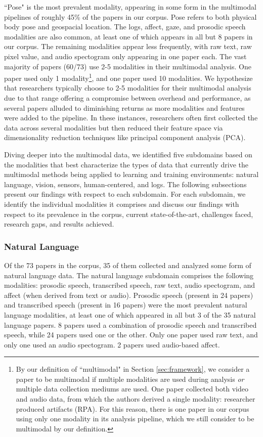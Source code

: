\documentclass[manuscript,screen,review]{acmart}
\begin{document}
``Pose" is the most prevalent modality, appearing in some form in the multimodal pipelines of roughly 45\% of the papers in our corpus. Pose refers to both physical body pose and geospacial location. The logs, affect, gaze, and prosodic speech modalities are also common, at least one of which appears in all but 8 papers in our corpus. The remaining modalities appear less frequently, with raw text, raw pixel value, and audio spectogram only appearing in one paper each. The vast majority of papers (60/73) use 2-5 modalities in their multimodal analysis. One paper used only 1 modality\footnote{By our definition of ``multimodal" in Section \ref{sec:framework}, we consider a paper to be multimodal if multiple modalities are used during analysis \textit{or} multiple data collection mediums are used. One paper \cite{3809293172} collected both video and audio data, from which the authors derived a single modality: researcher produced artifacts (RPA). For this reason, there is one paper in our corpus using only one modality in its analysis pipeline, which we still consider to be multimodal by our definition.}, and one paper used 10 modalities. We hypothesize that researchers typically choose to 2-5 modalities for their multimodal analysis due to that range offering a compromise between overhead and performance, as several papers alluded to diminishing returns as more modalities and features were added to the pipeline. In these instances, researchers often first collected the data across several modalities but then reduced their feature space via dimensionality reduction techniques like principal component analysis (PCA). 

Diving deeper into the multimodal data, we identified five subdomains based on the modalities that best characterize the types of data that currently drive the multimodal methods being applied to learning and training environments: natural language, vision, sensors, human-centered, and logs. The following subsections present our findings with respect to each subdomain. For each subdomain, we identify the individual modalities it comprises and discuss our findings with respect to its prevalence in the corpus, current state-of-the-art, challenges faced, research gaps, and results achieved.

\subsubsection{Natural Language}

Of the 73 papers in the corpus, 35 of them collected and analyzed some form of natural language data. The natural language subdomain comprises the following modalities: prosodic speech, transcribed speech, raw text, audio spectogram, and affect (when derived from text or audio). Prosodic speech (present in 24 papers) and transcribed speech (present in 16 papers) were the most prevalent natural language modalities, at least one of which appeared in all but 3 of the 35 natural language papers. 8 papers used a combination of prosodic speech and transcribed speech, while 24 papers used one or the other. Only one paper used raw text, and only one used an audio spectogram. 2 papers used audio-based affect.
\end{document}
